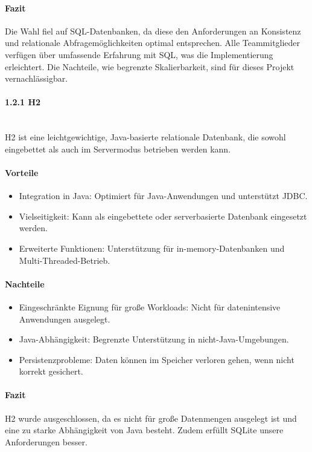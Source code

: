 \documentclass[a4paper,12pt]{report}
\begin{document}
    \paragraph{Fazit}
    Die Wahl fiel auf SQL-Datenbanken, da diese den Anforderungen an Konsistenz und relationale Abfragemöglichkeiten optimal entsprechen.
    Alle Teammitglieder verfügen über umfassende Erfahrung mit SQL, was die Implementierung erleichtert.
    Die Nachteile, wie begrenzte Skalierbarkeit, sind für dieses Projekt vernachlässigbar.

    \paragraph{1.2.1 H2}\mbox{}\\
    H2 ist eine leichtgewichtige, Java-basierte relationale Datenbank, die sowohl eingebettet als auch im Servermodus betrieben werden kann.

    \paragraph{Vorteile}
    \begin{itemize}
        \item Integration in Java: Optimiert für Java-Anwendungen und unterstützt JDBC.
        \item Vielseitigkeit: Kann als eingebettete oder serverbasierte Datenbank eingesetzt werden.
        \item Erweiterte Funktionen: Unterstützung für in-memory-Datenbanken und Multi-Threaded-Betrieb.
    \end{itemize}

    \paragraph{Nachteile}
    \begin{itemize}
        \item Eingeschränkte Eignung für große Workloads: Nicht für datenintensive Anwendungen ausgelegt.
        \item Java-Abhängigkeit: Begrenzte Unterstützung in nicht-Java-Umgebungen.
        \item Persistenzprobleme: Daten können im Speicher verloren gehen, wenn nicht korrekt gesichert.
    \end{itemize}

    \paragraph{Fazit}
    H2 wurde ausgeschlossen, da es nicht für große Datenmengen ausgelegt ist und eine zu starke Abhängigkeit von Java besteht.
    Zudem erfüllt SQLite unsere Anforderungen besser.
\end{document}
